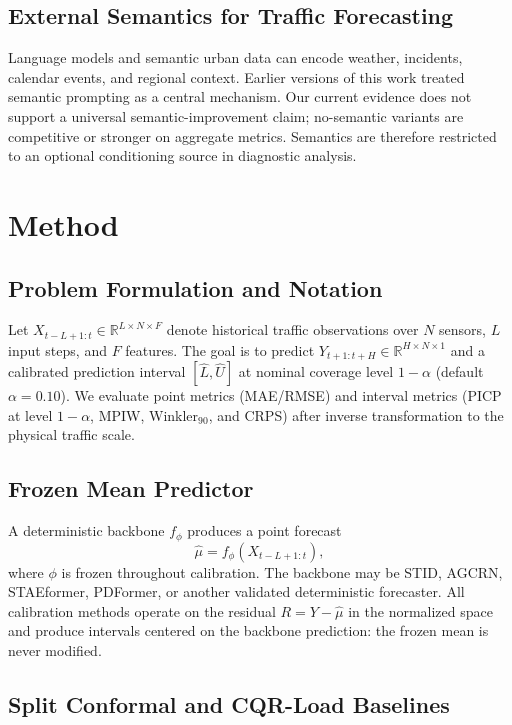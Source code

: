 \documentclass[letterpaper,journal]{IEEEtran}
\begin{document}
\subsection{External Semantics for Traffic Forecasting}
Language models and semantic urban data can encode weather, incidents,
calendar events, and regional context.  Earlier versions of this work
treated semantic prompting as a central mechanism.  Our current evidence
does not support a universal semantic-improvement claim; no-semantic
variants are competitive or stronger on aggregate metrics.  Semantics are
therefore restricted to an optional conditioning source in diagnostic
analysis.

\section{Method}

\subsection{Problem Formulation and Notation}
Let $X_{t-L+1:t}\in\mathbb{R}^{L\times N\times F}$ denote historical
traffic observations over $N$ sensors, $L$ input steps, and $F$ features.
The goal is to predict $Y_{t+1:t+H}\in\mathbb{R}^{H\times N\times 1}$ and
a calibrated prediction interval $[\hat{L},\hat{U}]$ at nominal coverage
level $1-\alpha$ (default $\alpha=0.10$).  We evaluate point metrics
(MAE/RMSE) and interval metrics (PICP at level $1-\alpha$, MPIW,
Winkler$_{90}$, and CRPS) after inverse transformation to the physical
traffic scale.

\subsection{Frozen Mean Predictor}
A deterministic backbone $f_\phi$ produces a point forecast
\begin{equation}
    \hat{\mu} = f_\phi(X_{t-L+1:t}),
\end{equation}
where $\phi$ is frozen throughout calibration.  The backbone may be STID,
AGCRN, STAEformer, PDFormer, or another validated deterministic
forecaster.  All calibration methods operate on the residual
$R = Y - \hat{\mu}$ in the normalized space and produce intervals centered
on the backbone prediction: the frozen mean is never modified.

\subsection{Split Conformal and CQR-Load Baselines}
\label{sec:cqr_baseline}
\end{document}
